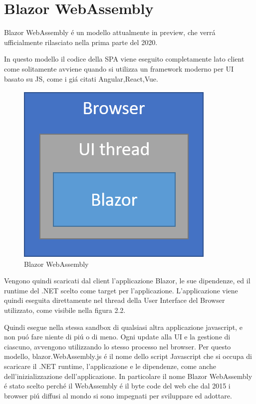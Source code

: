 \section{Blazor WebAssembly}\label{sez:bwa}
Blazor WebAssembly \'e un modello attualmente in preview, che verr\'a ufficialmente rilasciato nella prima parte del 2020.

In questo modello il codice della SPA viene eseguito completamente lato client come solitamente avviene quando si utilizza un framework moderno per UI basato su JS, come i gi\'a citati Angular,React,Vue.

\begin{figure}[H]
	\centerline{\includegraphics[scale=0.6]{figure/blazor-WebAssembly.png}}
	\caption{Blazor WebAssembly}
	\label{fig:BlazorWebAssembly}
\end{figure}

Vengono quindi scaricati dal client l'applicazione Blazor, le sue dipendenze, ed il runtime del .NET scelto come target per l'applicazione.
L'applicazione viene quindi eseguita direttamente nel thread della User Interface del Browser utilizzato, come visibile nella figura 2.2.

Quindi esegue nella stessa sandbox di qualsiasi altra applicazione javascript, e non pu\'o fare niente di pi\'u o di meno. Ogni update alla UI e la gestione di ciascuno, avvengono utilizzando lo stesso processo nel browser. Per questo modello, blazor.WebAssembly.js \'e il nome dello script Javascript che si occupa di scaricare il .NET runtime, l'applicazione e le dipendenze, come anche dell'inizializzazione dell'applicazione. 
In particolare il nome Blazor WebAssembly \'e stato scelto perch\'e il WebAssembly \'e il byte code del web che dal 2015 i browser pi\'u diffusi al mondo si sono impegnati per sviluppare ed adottare.
\pagebreak


